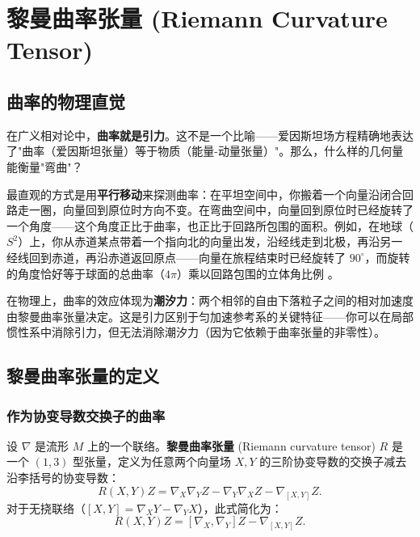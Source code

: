\chapter{黎曼曲率张量 (Riemann Curvature Tensor)}
\label{chap:curvature}

\section{曲率的物理直觉}

\begin{note}[物理动机]
在广义相对论中，\textbf{曲率就是引力}。这不是一个比喻——爱因斯坦场方程精确地表达了"曲率（爱因斯坦张量）等于物质（能量-动量张量）"。那么，什么样的几何量能衡量"弯曲"？

最直观的方式是用\textbf{平行移动}来探测曲率：在平坦空间中，你搬着一个向量沿闭合回路走一圈，向量回到原位时方向不变。在弯曲空间中，向量回到原位时已经旋转了一个角度——这个角度正比于曲率，也正比于回路所包围的面积。例如，在地球（$S^2$）上，你从赤道某点带着一个指向北的向量出发，沿经线走到北极，再沿另一经线回到赤道，再沿赤道返回原点——向量在旅程结束时已经旋转了 $90^\circ$，而旋转的角度恰好等于球面的总曲率（$4\pi$）乘以回路包围的立体角比例 \cite{Carroll1997}。

在物理上，曲率的效应体现为\textbf{潮汐力}：两个相邻的自由下落粒子之间的相对加速度由黎曼曲率张量决定。这是引力区别于匀加速参考系的关键特征——你可以在局部惯性系中消除引力，但无法消除潮汐力（因为它依赖于曲率张量的非零性）。
\end{note}

\section{黎曼曲率张量的定义}

\subsection{作为协变导数交换子的曲率}

\begin{definition}
设 $\nabla$ 是流形 $M$ 上的一个联络。\textbf{黎曼曲率张量} (Riemann curvature tensor) $R$ 是一个 $(1,3)$ 型张量，定义为任意两个向量场 $X, Y$ 的三阶协变导数的交换子减去沿李括号的协变导数：
\begin{equation}
    R(X, Y) Z = \nabla_X \nabla_Y Z - \nabla_Y \nabla_X Z - \nabla_{[X, Y]} Z.
\end{equation}
对于无挠联络（$[X, Y] = \nabla_X Y - \nabla_Y X$），此式简化为：
\begin{equation}
    R(X, Y) Z = [\nabla_X, \nabla_Y] Z - \nabla_{[X,Y]} Z.
\end{equation}
\end{definition}

